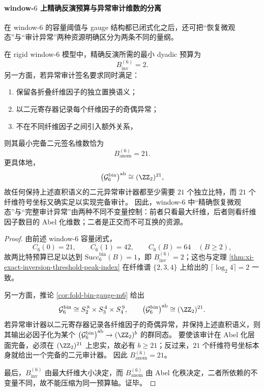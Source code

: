 \paragraph{window-\texorpdfstring{$6$}{6} 上精确反演预算与异常审计维数的分离}
在 window-\(6\) 的容量阈值与 gauge 结构都已闭式化之后，还可把“恢复微观态”与“审计异常”两种资源明确区分为两条不同的量纲。

\begin{proposition}\label{prop:xi-window6-exact-inversion-vs-anomaly-audit}
在 rigid window-\(6\) 模型中，精确反演所需的最小 dyadic 预算为
\[
\boxed{\;
B_{\mathrm{inv}}^{(6)}=2.\;}
\]
另一方面，若异常审计签名要求同时满足：
\begin{enumerate}
  \item 保留各折叠纤维因子的独立置换语义；
  \item 以二元寄存器记录每个纤维因子的奇偶异常；
  \item 不在不同纤维因子之间引入额外关系，
\end{enumerate}
则其最小完备二元签名维数恰为
\[
\boxed{\;
B_{\mathrm{anom}}^{(6)}=21.\;}
\]
更具体地，
\[
\bigl(\mathcal G^{\mathrm{bin}}_6\bigr)^{\mathrm{ab}}\cong(\ZZ_2)^{21},
\]
故任何保持上述直积语义的二元异常审计器都至少需要 \(21\) 个独立比特，而 \(21\) 个纤维符号坐标又确实足以实现完备审计。
因此，window-\(6\) 中“精确恢复微观态”与“完整审计异常”由两种不同不变量控制：前者只看最大纤维，后者则看纤维因子数目的 Abel 化维数；二者是正交而不可互换的资源。
\end{proposition}
\begin{proof}
由前述 window-\(6\) 容量闭式，
\[
C_6(0)=21,\qquad C_6(1)=42,\qquad C_6(B)=64\quad(B\ge 2),
\]
故两比特预算已足以达到 \(\mathrm{Succ}^{\mathrm{bin}}_6(B)=1\)，即 \(B_{\mathrm{inv}}^{(6)}=2\)；这也与定理 \ref{thm:xi-exact-inversion-threshold-peak-index} 在纤维谱 \(\{2,3,4\}\) 上给出的
\(
\lceil \log_2 4\rceil=2
\)
一致。

另一方面，推论 \ref{cor:fold-bin-gauge-m6} 给出
\[
\mathcal G^{\mathrm{bin}}_6\cong S_2^{\,8}\times S_3^{\,4}\times S_4^{\,9},
\qquad
\bigl(\mathcal G^{\mathrm{bin}}_6\bigr)^{\mathrm{ab}}\cong(\ZZ_2)^{21}.
\]
若异常审计器以二元寄存器记录各纤维因子的奇偶异常，并保持上述直积语义，则其输出必因子化为某个
\(
\bigl(\mathcal G^{\mathrm{bin}}_6\bigr)^{\mathrm{ab}}\to(\ZZ_2)^b
\)
的群同态。
要使该审计在 Abel 化层面完备，必须在 \((\ZZ_2)^{21}\) 上忠实，故必有 \(b\ge 21\)；反过来，\(21\) 个纤维符号坐标本身就给出一个完备的二元审计器。
因此 \(B_{\mathrm{anom}}^{(6)}=21\)。

最后，\(B_{\mathrm{inv}}^{(6)}\) 由最大纤维大小决定，而 \(B_{\mathrm{anom}}^{(6)}\) 由 Abel 化秩决定，二者所依赖的不变量不同，故不能压缩为同一预算轴。证毕。
\end{proof}

